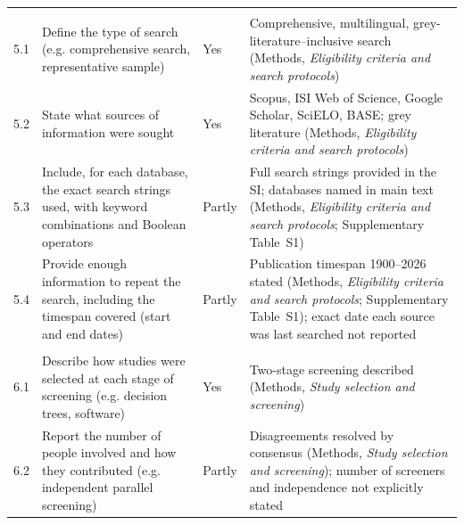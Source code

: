 \begin{longtable}{@{}p{0.9cm} p{5.5cm} p{1.4cm} p{6.0cm}@{}}
\addlinespace
\multicolumn{4}{@{}l}{\textbf{Finding studies}}\\
5.1 & Define the type of search (e.g. comprehensive search, representative sample) & Yes & Comprehensive, multilingual, grey-literature--inclusive search (Methods, \emph{Eligibility criteria and search protocols}) \\
5.2 & State what sources of information were sought & Yes & Scopus, ISI Web of Science, Google Scholar, SciELO, BASE; grey literature (Methods, \emph{Eligibility criteria and search protocols}) \\
5.3 & Include, for each database, the exact search strings used, with keyword combinations and Boolean operators & Partly & Full search strings provided in the SI; databases named in main text (Methods, \emph{Eligibility criteria and search protocols}; Supplementary Table~S1) \\
5.4 & Provide enough information to repeat the search, including the timespan covered (start and end dates) & Partly & Publication timespan 1900--2026 stated (Methods, \emph{Eligibility criteria and search protocols}; Supplementary Table~S1); exact date each source was last searched not reported \\

\addlinespace
\multicolumn{4}{@{}l}{\textbf{Study selection}}\\
6.1 & Describe how studies were selected at each stage of screening (e.g. decision trees, software) & Yes & Two-stage screening described (Methods, \emph{Study selection and screening}) \\
6.2 & Report the number of people involved and how they contributed (e.g. independent parallel screening) & Partly & Disagreements resolved by consensus (Methods, \emph{Study selection and screening}); number of screeners and independence not explicitly stated \\


\end{longtable}
